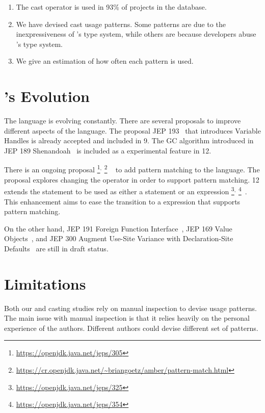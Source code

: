 \begin{enumerate}[label=\ref{casts:rq\arabic*},leftmargin=3.4\parindent]
\item {\bf \crqA} 
The cast operator is used in 93\% of projects in the \lgtm{} database.
\item {\bf \crqB}
We have devised cast usage patterns.
Some patterns are due to the inexpressiveness of \java{}'s type system,
while others are because developers abuse \java{}'s type system.
\item {\bf \crqC} 
We give an estimation of how often each pattern is used.
\end{enumerate}


\section{\java{}'s Evolution}

The \java{} language is evolving constantly.
There are several proposals to improve different aspects of the language.
The proposal JEP 193~\citep{jep193} that introduces Variable Handles is already accepted and included in \java{} 9.
The GC algorithm introduced in JEP 189 Shenandoah~\citep{jep189} is included as a experimental feature in \java{} 12.

There is an ongoing proposal%
\footnote{\url{https://openjdk.java.net/jeps/305}}$^{,}$%
\footnote{\url{https://cr.openjdk.java.net/~briangoetz/amber/pattern-match.html}}%
~\citep{jep305} to add pattern matching to the \java{} language.
The proposal explores changing the  operator in order to support pattern matching.
\java{} 12 extends the  statement to be used as either a statement or an expression%
\footnote{\url{https://openjdk.java.net/jeps/325}}$^{,}$%
\footnote{\url{https://openjdk.java.net/jeps/354}}~\citep{jep325,jep354}.
This enhancement aims to ease the transition to a  expression that supports pattern matching.

On the other hand,
JEP 191 Foreign Function Interface~\citep{jep191},
JEP 169 Value Objects~\citep{jep169}, and
JEP 300 Augment Use-Site Variance with Declaration-Site Defaults~\citep{jep300}
are still in draft status.


\section{Limitations}

Both our \unsafe{} and casting studies rely on manual inspection to devise usage patterns.
The main issue with manual inspection is that it relies heavily on the personal experience of the authors.
Different authors could devise different set of patterns.

